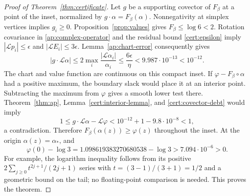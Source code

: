 \begin{proof}[Proof of Theorem~\ref{thm:certificate}]
Let $g$ be a supporting covector of $F_\beta$ at a point of the inset,
normalized by $g\cdot\alpha=F_\beta(\alpha)$.  Nonnegativity at simplex
vertices implies $g_i\geq0$.  Proposition~\ref{prop:values} gives
$F_\beta\leq\log6<2$.  Rotation covariance in
\eqref{ap:complex-operator} and the residual bound \eqref{cert:epsilon} imply
$|\mathcal Lp_i|\leq\epsilon$ and
$|\mathcal LE_i|\leq3\epsilon$.  Lemma~\ref{ap:chart-error} consequently
gives
\begin{equation}\label{cert:covector-debt}
 |g\cdot\mathcal L\alpha|
 \leq2\max_i\frac{|\mathcal L\alpha_i|}{\alpha_i}
 \leq\frac{6\epsilon}{\eta}
 <9.987\cdot10^{-13}<10^{-12}.
\end{equation}
The chart and value function are continuous on this compact inset.
If $\varphi-F_\beta\circ\alpha$ had a positive maximum, the boundary
slack would place it at an interior point.  Subtracting the maximum from
$\varphi$ gives a smooth lower test there.  Theorem~\ref{thm:ap},
Lemma~\ref{cert:interior-lemma}, and \eqref{cert:covector-debt} would imply
\[
 1\leq g\cdot\mathcal L\alpha-\mathcal L\varphi
       <10^{-12}+1-9.8\cdot10^{-8}<1,
\]
a contradiction.  Therefore $F_\beta(\alpha(z))\geq\varphi(z)$ throughout
the inset.  At the origin $\alpha(z)=\alpha_*$, and
\[
 \varphi(0)-\log3
 =1.098619383270680538-\log3>7.094\cdot10^{-6}>0.
\]
For example, the logarithm inequality follows from its positive
$2\sum_{j\geq0}t^{2j+1}/(2j+1)$ series with $t=(3-1)/(3+1)=1/2$ and
a geometric bound on the tail; no floating-point comparison is needed.
This proves the theorem.
\end{proof}
